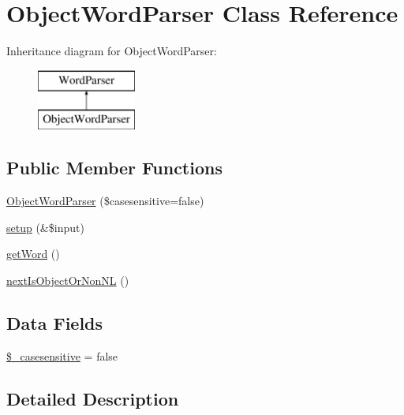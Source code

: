 \hypertarget{class_object_word_parser}{\section{\-Object\-Word\-Parser \-Class \-Reference}
\label{class_object_word_parser}
}
\-Inheritance diagram for \-Object\-Word\-Parser\-:\begin{figure}[H]
\begin{center}
\leavevmode
\includegraphics[height=2.000000cm]{class_object_word_parser}
\end{center}
\end{figure}
\subsection*{\-Public \-Member \-Functions}
\begin{DoxyCompactItemize}
\item 
\hyperlink{class_object_word_parser_a727bc7c019d693f644bc68cdeaac756d}{\-Object\-Word\-Parser} (\$casesensitive=false)
\item 
\hyperlink{class_object_word_parser_a1545e049222168d79849355fe4343067}{setup} (\&\$input)
\item 
\hyperlink{class_object_word_parser_aed2fad5b3be15693fc9b44b7b73af497}{get\-Word} ()
\item 
\hyperlink{class_object_word_parser_a262dd19cf075626e7fcb8e73f891068f}{next\-Is\-Object\-Or\-Non\-N\-L} ()
\end{DoxyCompactItemize}
\subsection*{\-Data \-Fields}
\begin{DoxyCompactItemize}
\item 
\hyperlink{class_object_word_parser_a5b830a5b931a201674311dfdee4dd6c5}{\$\-\_\-casesensitive} = false
\end{DoxyCompactItemize}


\subsection{\-Detailed \-Description}


